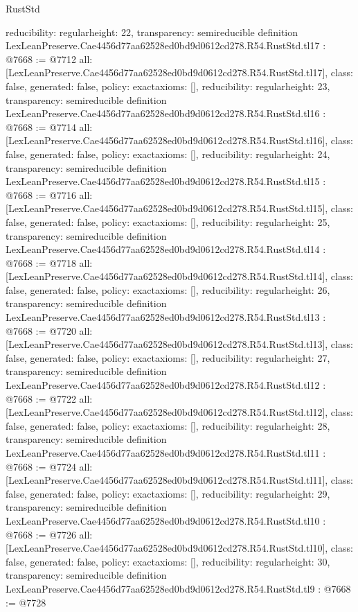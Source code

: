 \begin{lexlean}{RustStd}
\begin{coremodule}
{  reducibility: regular{height: 22},
  transparency: semireducible
}
definition LexLeanPreserve.Cae4456d77aa62528ed0bd9d0612cd278.R54.RustStd.tl17 : @7668 := @7712 {
  all: [LexLeanPreserve.Cae4456d77aa62528ed0bd9d0612cd278.R54.RustStd.tl17],
  class: false,
  generated: false,
  policy: exact{axioms: []},
  reducibility: regular{height: 23},
  transparency: semireducible
}
definition LexLeanPreserve.Cae4456d77aa62528ed0bd9d0612cd278.R54.RustStd.tl16 : @7668 := @7714 {
  all: [LexLeanPreserve.Cae4456d77aa62528ed0bd9d0612cd278.R54.RustStd.tl16],
  class: false,
  generated: false,
  policy: exact{axioms: []},
  reducibility: regular{height: 24},
  transparency: semireducible
}
definition LexLeanPreserve.Cae4456d77aa62528ed0bd9d0612cd278.R54.RustStd.tl15 : @7668 := @7716 {
  all: [LexLeanPreserve.Cae4456d77aa62528ed0bd9d0612cd278.R54.RustStd.tl15],
  class: false,
  generated: false,
  policy: exact{axioms: []},
  reducibility: regular{height: 25},
  transparency: semireducible
}
definition LexLeanPreserve.Cae4456d77aa62528ed0bd9d0612cd278.R54.RustStd.tl14 : @7668 := @7718 {
  all: [LexLeanPreserve.Cae4456d77aa62528ed0bd9d0612cd278.R54.RustStd.tl14],
  class: false,
  generated: false,
  policy: exact{axioms: []},
  reducibility: regular{height: 26},
  transparency: semireducible
}
definition LexLeanPreserve.Cae4456d77aa62528ed0bd9d0612cd278.R54.RustStd.tl13 : @7668 := @7720 {
  all: [LexLeanPreserve.Cae4456d77aa62528ed0bd9d0612cd278.R54.RustStd.tl13],
  class: false,
  generated: false,
  policy: exact{axioms: []},
  reducibility: regular{height: 27},
  transparency: semireducible
}
definition LexLeanPreserve.Cae4456d77aa62528ed0bd9d0612cd278.R54.RustStd.tl12 : @7668 := @7722 {
  all: [LexLeanPreserve.Cae4456d77aa62528ed0bd9d0612cd278.R54.RustStd.tl12],
  class: false,
  generated: false,
  policy: exact{axioms: []},
  reducibility: regular{height: 28},
  transparency: semireducible
}
definition LexLeanPreserve.Cae4456d77aa62528ed0bd9d0612cd278.R54.RustStd.tl11 : @7668 := @7724 {
  all: [LexLeanPreserve.Cae4456d77aa62528ed0bd9d0612cd278.R54.RustStd.tl11],
  class: false,
  generated: false,
  policy: exact{axioms: []},
  reducibility: regular{height: 29},
  transparency: semireducible
}
definition LexLeanPreserve.Cae4456d77aa62528ed0bd9d0612cd278.R54.RustStd.tl10 : @7668 := @7726 {
  all: [LexLeanPreserve.Cae4456d77aa62528ed0bd9d0612cd278.R54.RustStd.tl10],
  class: false,
  generated: false,
  policy: exact{axioms: []},
  reducibility: regular{height: 30},
  transparency: semireducible
}
definition LexLeanPreserve.Cae4456d77aa62528ed0bd9d0612cd278.R54.RustStd.tl9 : @7668 := @7728 {
}
\end{coremodule}
\end{lexlean}
